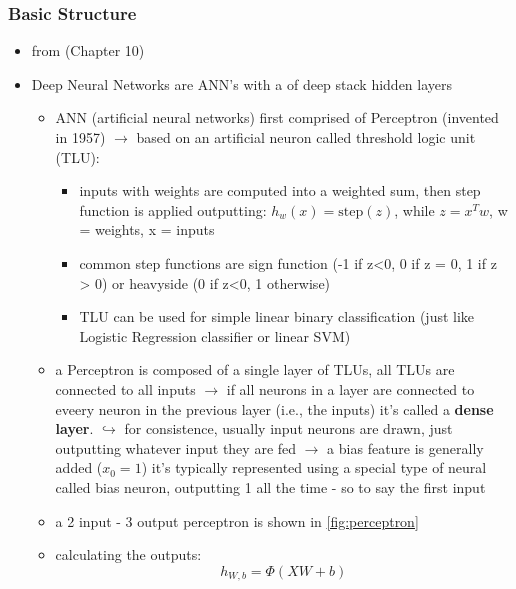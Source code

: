\documentclass[12pt,a4paper]{article}
\begin{document}
\subsubsection{Basic Structure} %
\label{ssub:basic_structure}
\begin{itemize}
  \item from  \cite{geron_hands-machine_2019} (Chapter 10)
  \item Deep Neural Networks are ANN's with a of deep stack hidden layers  
  \begin{itemize}
    \item ANN (artificial neural networks) first comprised of Perceptron (invented in 1957)
    \newline \indent $\longrightarrow$ based on an artificial neuron called threshold logic unit (TLU):
    \begin{itemize}
      \item inputs with weights are computed into a weighted sum, then step function is applied outputting: $h_w(x) = \mathrm{step}(z)$, while $z = x^T w$, w = weights, x = inputs
      \item common step functions are sign function (-1 if z<0, 0 if z = 0, 1 if z > 0) or heavyside (0 if z<0, 1 otherwise)
      \item TLU can be used for simple linear binary classification (just like Logistic Regression classifier or linear SVM)
    \end{itemize}
    \item a Perceptron is composed of a single layer of TLUs, all TLUs are connected to all inputs
    \newline \indent $\longrightarrow$ if all neurons in a layer are connected to eveery neuron in the previous layer (i.e., the inputs) it's called a \textbf{dense layer}.
    \newline \indent $\hookrightarrow$ for consistence, usually input neurons are drawn, just outputting whatever input they are fed
    \newline \indent $\longrightarrow$ a bias feature is generally added ($x_0=1$) it's typically represented using a special type of neural called bias neuron, outputting 1 all the time - so to say the first input
    \item a 2 input - 3 output perceptron is shown in \ref{fig:perceptron}
    \item calculating the outputs:
    \begin{equation}
      h_{W, b} = \Phi (XW + b)
    \end{equation}

\end{itemize}
\end{itemize}
\end{document}

